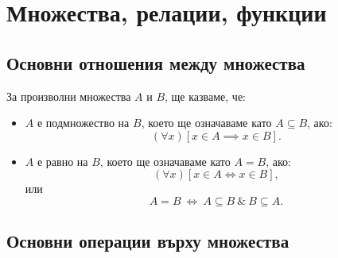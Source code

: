 \section{Множества, релации, функции}\label{sect:intro:sets}

\subsection*{Основни отношения между множества}

За произволни множества $A$ и $B$, ще казваме, че:
\begin{itemize}
\item
  $A$ е подмножество на $B$, което ще означаваме като $A \subseteq B$, ако:
  \[(\forall x)[x \in A \implies x \in B].\]
\item
  $A$ е равно на $B$, което ще означаваме като $A = B$, ако:
  \[(\forall x)[x \in A \iff x \in B],\]
  или
  \[A = B\ \iff\ A \subseteq B\ \&\ B \subseteq A.\]
\end{itemize}

\subsection*{Основни операции върху множества}

